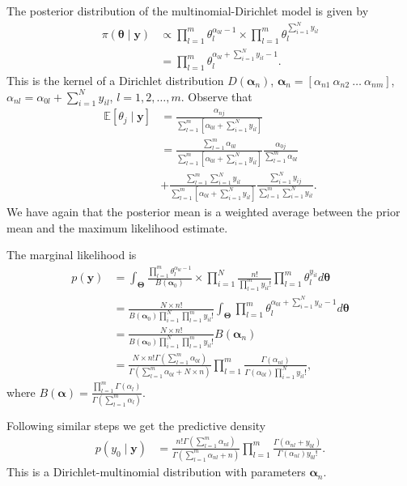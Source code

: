 \begin{enumerate}
The posterior distribution of the multinomial-Dirichlet model is given by
\begin{align}
	\pi(\bm{\theta}\mid \bm{y})&\propto \prod_{l=1}^m \theta_l^{\alpha_{0l}-1}\times\prod_{l=1}^m \theta_l^{\sum_{i=1}^{N} y_{il}}\nonumber\\
	&=\prod_{l=1}^m \theta_l^{\alpha_{0l}+\sum_{i=1}^{N} y_{il}-1}\nonumber.
\end{align}
This is the kernel of a Dirichlet distribution $D(\bm{\alpha}_n)$, $\bm{\alpha}_n=\left[\alpha_{n1} \ \alpha_{n2} \ \dots \ \alpha_{nm}\right]$, $\alpha_{nl}=\alpha_{0l}+\sum_{i=1}^{N}y_{il}$, $l=1,2,\dots,m$. Observe that
\begin{align}
	\mathbb{E}[\theta_{j}\mid \bm{y}]&=\frac{\alpha_{nj}}{\sum_{l=1}^m \left[\alpha_{0l}+\sum_{i=1}^N y_{il}\right]}\nonumber\\
	&=\frac{\sum_{l=1}^m \alpha_{0l}}{\sum_{l=1}^m \left[\alpha_{0l}+\sum_{i=1}^N y_{il}\right]}\frac{\alpha_{0j}}{\sum_{l=1}^m \alpha_{0l}}\nonumber\\
	&+\frac{\sum_{l=1}^m\sum_{i=1}^N y_{il}}{\sum_{l=1}^m \left[\alpha_{0l}+\sum_{i=1}^N y_{il}\right]}\frac{\sum_{i=1}^N y_{ij}}{\sum_{l=1}^m\sum_{i=1}^N y_{il}}.\nonumber
\end{align}
We have again that the posterior mean is a weighted average between the prior mean and the maximum likelihood estimate.

The marginal likelihood is
\begin{align}
	p(\bm{y})&=\int_{\bm{\Theta}}\frac{\prod_{l=1}^m \theta_l^{\alpha_{0l}-1}}{B(\bm{\alpha}_0)}\times \prod_{i=1}^N\frac{n!}{\prod_{l=1}^m y_{il}!}\prod_{l=1}^m \theta_{l}^{y_{il}}d\bm{\theta}\nonumber\\
	&=\frac{N\times n!}{B(\bm{\alpha}_0)\prod_{i=1}^N\prod_{l=1}^m y_{il}!}\int_{\bm{\Theta}} \prod_{l=1}^m \theta_l^{\alpha_{0l}+\sum_{i=1}^N y_{il}-1} d\bm{\theta}\nonumber\\
	&=\frac{N\times n!}{B(\bm{\alpha}_0)\prod_{i=1}^N\prod_{l=1}^m y_{il}!}B(\bm{\alpha}_n)\nonumber\\
	&=\frac{N\times n! \Gamma\left(\sum_{l=1}^m\nonumber \alpha_{0l}\right)}{\Gamma\left(\sum_{l=1}^m \alpha_{0l}+N\times n\right)}\prod_{l=1}^m \frac{\Gamma\left( \alpha_{nl}\right)}{\Gamma\left(\alpha_{0l}\right)\prod_{i=1}^N y_{il}!},\nonumber
\end{align}
where $B(\bm{\alpha})=\frac{\prod_{l=1}^m\Gamma(\alpha_l)}{\Gamma\left(\sum_{l=1}^m \alpha_l\right)}$.

Following similar steps we get the predictive density
\begin{align}
	p(y_0\mid \bm{y})&=\frac{ n! \Gamma\left(\sum_{l=1}^m \alpha_{nl}\right)}{\Gamma\left(\sum_{l=1}^m \alpha_{nl}+ n\right)}\prod_{l=1}^m \frac{\Gamma\left( \alpha_{nl}+y_{0l}\right)}{\Gamma\left(\alpha_{nl}\right) y_{0l}!}.\nonumber
\end{align}
This is a Dirichlet-multinomial distribution with parameters $\bm{\alpha}_n$.\\


\end{enumerate}
